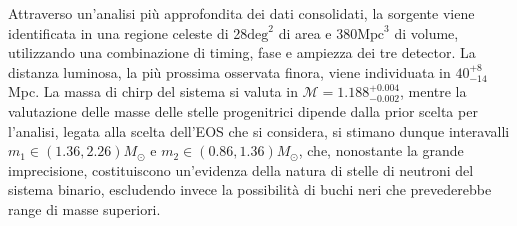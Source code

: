 Attraverso un'analisi più approfondita dei dati consolidati, la sorgente viene identificata in una regione celeste di 28$\text{deg}^2$ di area e $380\text{Mpc}^3$ di volume, utilizzando una combinazione di timing, fase e ampiezza dei tre detector. La distanza luminosa, la più prossima osservata finora, viene individuata in $40_{-14}^{+8}$Mpc. La massa di chirp del sistema si valuta in $\mathcal{M}=1.188_{-0.002}^{+0.004}$, mentre la valutazione delle masse delle stelle progenitrici dipende dalla prior scelta per l'analisi, legata alla scelta dell'EOS che si considera, si stimano dunque interavalli $m_1 \in (1.36, 2.26)M_\odot$ e $m_2 \in (0.86, 1.36)M_\odot$, che, nonostante la grande imprecisione, costituiscono un'evidenza della natura di stelle di neutroni del sistema binario, escludendo invece la possibilità di buchi neri che prevederebbe range di masse superiori\cite{Abbott_2017a}.

